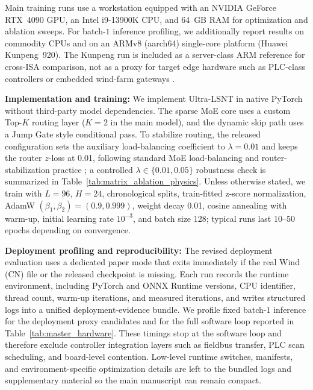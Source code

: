 \documentclass[review,1p,times]{elsarticle}
\begin{document}
Main training runs use a workstation equipped with an NVIDIA GeForce RTX~4090 GPU, an Intel i9-13900K CPU, and 64~GB RAM for optimization and ablation sweeps. For batch-$1$ inference profiling, we additionally report results on commodity CPUs and on an ARMv8 (aarch64) single-core platform (Huawei Kunpeng~920). The Kunpeng run is included as a server-class ARM reference for cross-ISA comparison, not as a proxy for target edge hardware such as PLC-class controllers or embedded wind-farm gateways \citep{liang2024edgepower,ortiz2025tinyml}.



\noindent\textbf{Implementation and training:} We implement Ultra-LSNT in native PyTorch without third-party model dependencies. The sparse MoE core uses a custom Top-$K$ routing layer ($K=2$ in the main model), and the dynamic skip path uses a Jump Gate style conditional pass. To stabilize routing, the released configuration sets the auxiliary load-balancing coefficient to $\lambda=0.01$ and keeps the router $z$-loss at 0.01, following standard MoE load-balancing and router-stabilization practice \citep{fedus2022switch}; a controlled $\lambda\in\{0.01,0.05\}$ robustness check is summarized in Table~\ref{tab:matrix_ablation_physics}. Unless otherwise stated, we train with $L=96$, $H=24$, chronological splits, train-fitted z-score normalization, AdamW $(\beta_1,\beta_2)=(0.9,0.999)$, weight decay 0.01, cosine annealing with warm-up, initial learning rate $10^{-3}$, and batch size 128; typical runs last 10--50 epochs depending on convergence.

\noindent\textbf{Deployment profiling and reproducibility:} The revised deployment evaluation uses a dedicated paper mode that exits immediately if the real Wind (CN) file or the released checkpoint is missing. Each run records the runtime environment, including PyTorch and ONNX Runtime versions, CPU identifier, thread count, warm-up iterations, and measured iterations, and writes structured logs into a unified deployment-evidence bundle. We profile fixed batch-$1$ inference for the deployment proxy candidates and for the full software loop reported in Table~\ref{tab:master_hardware}. These timings stop at the software loop and therefore exclude controller integration layers such as fieldbus transfer, PLC scan scheduling, and board-level contention. Low-level runtime switches, manifests, and environment-specific optimization details are left to the bundled logs and supplementary material so the main manuscript can remain compact.
\end{document}
